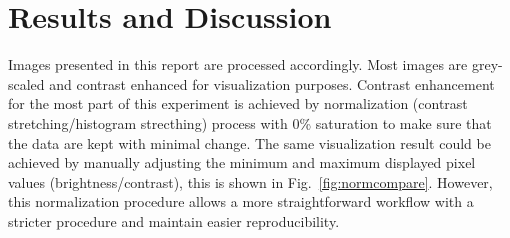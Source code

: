 
\section{Results and Discussion}

Images presented in this report are processed accordingly. 
Most images are grey-scaled and contrast enhanced for visualization purposes. 
Contrast enhancement for the most part of this experiment is achieved by normalization (contrast stretching/histogram strecthing) process with 0\% saturation to make sure that the data are kept with minimal change. 
The same visualization result could be achieved by manually adjusting the minimum and maximum displayed pixel values (brightness/contrast), this is shown in Fig.~\ref{fig:normcompare}. 
However, this normalization procedure allows a more straightforward workflow with a stricter procedure and maintain easier reproducibility. 

